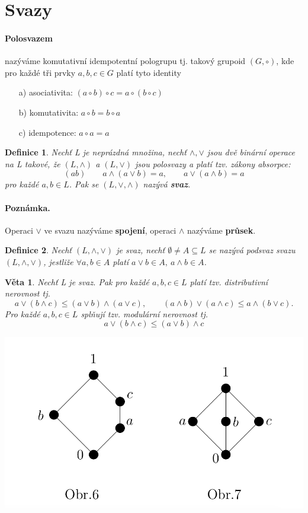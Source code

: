 \documentclass[12pt,a4paper]{article}
\newtheorem{definition}{Definice}
\newtheorem{sentence}{Věta}
\begin{document}
\section{Svazy}

\paragraph{Polosvazem} nazýváme komutativní idempotentní pologrupu tj. takový grupoid $(G, \circ)$, kde pro každé tři prvky $a,b,c \in G$ platí tyto identity  
\begin{itemize}
	\item[a)] asociativita: $(a \circ b) \circ c = a \circ (b \circ c)$
	\item[b)] komutativita: $a \circ b = b \circ a$
	\item[c)] idempotence: $a \circ a = a$
\end{itemize}

\begin{definition}
	Nechť L je neprázdná množina, nechť $\wedge, \vee$ jsou dvě binární operace na L takové, že $(L, \wedge)$ a $(L, \vee)$ jsou polosvazy a platí tzv. zákony absorpce:
	$$(ab) \qquad a \wedge (a \vee b) = a, \qquad a \vee (a \wedge b) = a$$
	pro každé $a,b \in L$. Pak se $(L, \vee, \wedge)$ nazývá \textbf{svaz}.
\end{definition}

\paragraph{Poznámka.} Operaci $\vee$ ve svazu nazýváme \textbf{spojení}, operaci $\wedge$ nazýváme \textbf{průsek}.

\begin{definition}
	Nechť $(L, \wedge, \vee)$ je svaz, nechť $\emptyset \not= A \subseteq L$ se nazývá podsvaz svazu 
	$(L, \wedge, \vee)$, jestliže $\forall a,b \in A$ platí $a \vee b \in A,\ a \wedge b \in A$.
\end{definition}

\begin{sentence}
	Nechť L je svaz. Pak pro každé $a,b,c \in L$ platí tzv. distributivní nerovnost tj. $$a \vee (b \wedge c) \leq (a \vee b) \wedge (a \vee c), \qquad (a \wedge b) \vee (a \wedge c) \leq a \wedge (b \vee c).$$
	Pro každé $a,b,c \in L$ splňují tzv. modulární nerovnost tj. $$a \vee (b \wedge c) \leq (a \vee b) \wedge c$$
\end{sentence}

\includegraphics[scale=0.4]{img/M3aN5Svazy}
\end{document}
